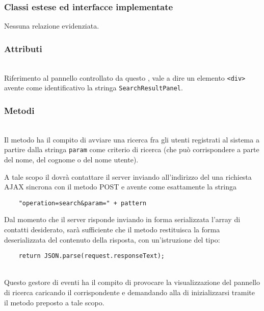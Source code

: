\subsubsection*{Classi estese ed interfacce implementate}
Nessuna relazione evidenziata.

\subsubsection*{Attributi}
\begin{description}
\item{}\\
Riferimento al pannello controllato da questo , vale a dire un elemento \verb'<div>' avente come identificativo la stringa \verb'SearchResultPanel'.
\end{description}

\subsubsection*{Metodi}
\begin{description}
  \item{}\\
  Il metodo ha il compito di avviare una ricerca fra gli utenti registrati al sistema a partire dalla stringa \verb'param' come criterio di ricerca (che può corrispondere a parte del nome, del cognome o del nome utente).
  
  A tale scopo il  dovrà contattare il server inviando all'indirizzo del una richiesta AJAX sincrona con il metodo POST e avente come  esattamente la stringa
  \begin{verbatim}
    "operation=search&param=" + pattern
  \end{verbatim}
  
  Dal momento che il server risponde inviando in forma serializzata l'array di contatti desiderato, sarà sufficiente che il metodo restituisca la forma deserializzata del contenuto della risposta, con un'istruzione del tipo:
  \begin{verbatim}
    return JSON.parse(request.responseText);
  \end{verbatim}
  
  \item{}\\
  Questo gestore di eventi ha il compito di provocare la visualizzazione del pannello di ricerca caricando il  corrispondente e demandando alla  di inizializzarsi tramite il metodo  preposto a tale scopo.
  
\end{description}


